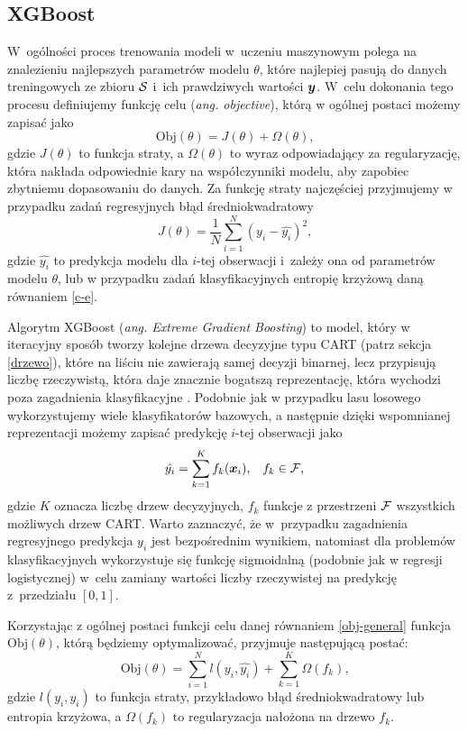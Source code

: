 \documentclass[inzynierska]{pwr_wmat_praca_dyplomowa}
\theoremstyle{plain}
\numberwithin{theorem}{chapter}
\theoremstyle{definition}
\numberwithin{theorem}{chapter}
\begin{document}
\subsection{XGBoost}
W~ogólności proces trenowania modeli w~uczeniu maszynowym polega na znalezieniu najlepszych parametrów modelu $\theta$, które najlepiej pasują do danych treningowych ze zbioru $\mathcal{S}$ i~ich prawdziwych wartości $\boldsymbol{y}$. W~celu dokonania tego procesu definiujemy funkcję celu (\textit{ang. objective}), którą w ogólnej postaci możemy zapisać jako
\begin{equation}
	\label{obj-general}
	\text{Obj}(\theta) = J(\theta) + \Omega(\theta) \text{,}
\end{equation}
gdzie $J(\theta)$ to funkcja straty, a $\Omega(\theta)$ to wyraz odpowiadający za regularyzację, która nakłada odpowiednie kary na współczynniki modelu, aby zapobiec zbytniemu dopasowaniu do danych. Za funkcję straty najczęściej przyjmujemy w przypadku zadań regresyjnych błąd średniokwadratowy
$$ J(\theta) = \frac{1}{N} \sum_{i=1}^{N} (y_i - \hat{y_i})^2 \text{,}$$
gdzie $\hat{y_i}$ to predykcja modelu dla $i$-tej obserwacji i~zależy ona od parametrów modelu $\theta$, lub w przypadku zadań klasyfikacyjnych entropię krzyżową daną równaniem \ref{c-e}.

Algorytm XGBoost (\textit{ang. Extreme Gradient Boosting}) to model, który w iteracyjny sposób tworzy kolejne drzewa decyzyjne typu CART (patrz sekcja \ref{drzewo}), które na liściu nie zawierają samej decyzji binarnej, lecz przypisują liczbę rzeczywistą, która daje znacznie bogatszą reprezentację, która wychodzi poza zagadnienia klasyfikacyjne \cite{xgboost}. Podobnie jak w przypadku lasu losowego wykorzystujemy wiele klasyfikatorów bazowych, a następnie dzięki wspomnianej reprezentacji możemy zapisać predykcję $i$-tej obserwacji jako
$$ \hat{y_i} = \sum_{k=1}^K f_k(\boldsymbol{x}_i) \text{,} \quad f_k \in \mathcal{F} \text{,} $$
gdzie $K$ oznacza liczbę drzew decyzyjnych, $f_k$ funkcje z przestrzeni $\mathcal{F}$ wszystkich możliwych drzew CART. Warto zaznaczyć, że w~przypadku zagadnienia regresyjnego predykcja $y_i$ jest bezpośrednim wynikiem, natomiast dla problemów klasyfikacyjnych wykorzystuje się funkcję sigmoidalną (podobnie jak w regresji logistycznej) w~celu zamiany wartości liczby rzeczywistej na predykcję z~przedziału $[0,1]$.

Korzystając z ogólnej postaci funkcji celu danej równaniem \ref{obj-general} funkcja $\text{Obj}(\theta)$, którą będziemy optymalizować, przyjmuje następującą postać:
$$ \text{Obj}(\theta) = \sum_{i=1}^{N} l(y_i, \hat{y_i}) + \sum_{k=1}^{K} \Omega(f_k) \text{,} $$
gdzie $l(y_i, \hat{y_i})$ to funkcja straty, przykładowo błąd średniokwadratowy lub entropia krzyżowa, a $\Omega(f_k)$ to regularyzacja nałożona na drzewo $f_k$.
\end{document}
